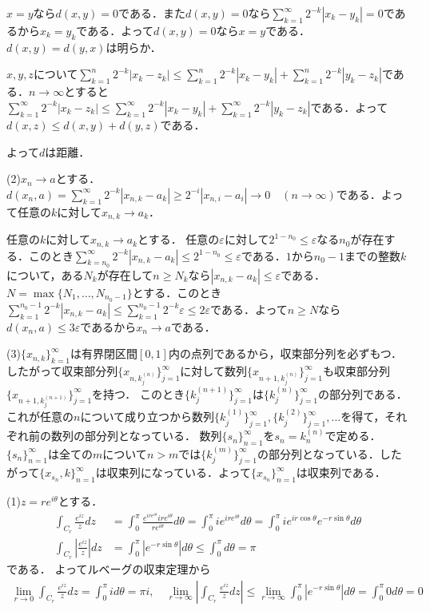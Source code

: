 \documentclass[
		book,
		head_space=20mm,
		foot_space=20mm,
		gutter=10mm,
		line_length=190mm
]{jlreq}
\begin{document}
$x=y$なら$d(x,y)=0$である．また$d(x,y)=0$なら$\sum\limits_{k=1}^\infty 2^{-k}|x_k-y_k|=0$であるから$x_k=y_k$である．よって$d(x,y)=0$なら$x=y$である．
$d(x,y)=d(y,x)$は明らか．

$x,y,z$について$\sum\limits_{k=1}^n  2^{-k}|x_k-z_k| \le \sum\limits_{k=1}^n 2^{-k} |x_k-y_k|+\sum\limits_{k=1}^n  2^{-k}|y_k-z_k|$である．$n\to\infty$とすると$\sum\limits_{k=1}^\infty  2^{-k}|x_k-z_k| \le \sum\limits_{k=1}^\infty 2^{-k} |x_k-y_k|+\sum\limits_{k=1}^\infty  2^{-k}|y_k-z_k|$である．よって$d(x,z)\le d(x,y)+d(y,z)$である．

よって$d$は距離．

(2)$x_n\rightarrow a$とする．$d(x_n,a)=\sum\limits_{k=1}^\infty 2^{-k} |x_{n,k}-a_k|\ge  2^{-i}|x_{n,i}-a_i| \rightarrow 0 \quad(n\rightarrow \infty)$である．よって任意の$k$に対して$x_{n,k}\rightarrow a_k$．

任意の$k$に対して$x_{n,k}\rightarrow a_k$とする．
任意の$\varepsilon$に対して$2^{1-n_0}\le\varepsilon$なる$n_0$が存在する．このとき$\sum\limits_{k=n_0}^\infty 2^{-k}|x_{n,k}-a_k|\le 2^{1-n_0}\le\varepsilon$である．$1$から$n_0-1$までの整数$k$について，ある$N_k$が存在して$n\ge N_k$なら$|x_{n,k}-a_k|\le \varepsilon$である．$N=\max\{N_1,\dots,N_{n_0-1}\}$とする．このとき$\sum\limits_{k=1}^{n_0-1} 2^{-k}|x_{n,k}-a_k|\le \sum\limits_{k=1}^{n_0-1} 2^{-k}\varepsilon\le2\varepsilon$である．よって$n\ge N$なら$d(x_n,a)\le 3\varepsilon$であるから$x_n\rightarrow a$である．

(3)$\{x_{n,k}\}_{k=1}^\infty$は有界閉区間$[0,1]$内の点列であるから，収束部分列を必ずもつ．
したがって収束部分列$\{x_{n,k_j^{(n)}}\}_{j=1}^\infty$に対して数列$\{ x_{n+1,k_j^{(n)}}\}_{j=1}^\infty$も収束部分列$\{x_{n+1,k_j^{(n+1)}}\}_{j=1}^\infty$を持つ．
このとき$\{k_j^{(n+1)}\}_{j=1}^\infty$は$\{k_j^{(n)}\}_{j=1}^\infty$の部分列である．
これが任意の$n$について成り立つから数列$\{k_j^{(1)}\}_{j=1}^\infty,\{k_j^{(2)}\}_{j=1}^\infty,\dots$を得て，それぞれ前の数列の部分列となっている．
数列$\{s_n\}_{n=1}^\infty$を$s_n=k_n^{(n)}$で定める．$\{s_n\}_{n=1}^\infty$は全ての$m$について$n>m$では$\{k_j^{(m)}\}_{j=1}^\infty$の部分列となっている．したがって$\{x_{s_n},k\}_{n=1}^\infty$は収束列になっている．よって$\{x_{s_n}\}_{n=1}^\infty$は収束列である．

(1)$z=re^{i\theta}$とする．
\begin{align}
	\int_{C_r}\frac{e^{iz}}{z}dz&=\int_0^\pi \frac{e^{ire^{i\theta}}ire^{i\theta}}{re^{i\theta}}d\theta=\int_0^\pi ie^{ire^{i\theta}}d\theta=\int_0^\pi i e^{ir \cos \theta}e^{-r \sin \theta}d\theta\\
	\int_{C_r}  \left| \frac{e^{iz}}{z} \right|dz &= \int_0^\pi \left| e^{-r\sin \theta} \right|d\theta \le \int_0^\pi d\theta=\pi
\end{align}である．
よってルベーグの収束定理から
\begin{align}
	\lim_{r \to 0} \int_{C_r} \frac{e^{iz}}{z}dz=\int_0^\pi id\theta=\pi i,\quad
	\lim_{r \to \infty}  \left|\int_{C_r}\frac{e^{iz}}{z}dz\right|\le\lim_{r \to \infty}\int_0^\pi \left| e^{-r\sin \theta} \right|d\theta = \int_0^\pi0 d\theta=0
\end{align}
\end{document}
